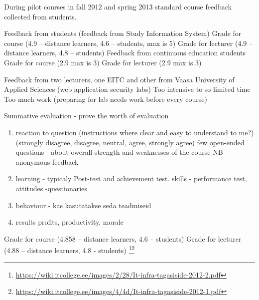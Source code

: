 During pilot courses in fall 2012 and spring 2013 standard course feedback collected from students. 

Feedback from students (feedback from Study Information System)
Grade for course  (4.9 -- distance learners, 4.6 -- students, max is 5) 
Grade for lecturer (4.9 -- distance learners, 4.8 -- students)
Feedback from continuous education students
Grade for course (2.9 max is 3)
Grade for lecturer (2.9 max is 3)



Feedback from two lecturers, one \gls{EITC} and other from Vaasa University of Applied Sciences (web application security labs)
Too intensive to so limited time
Too much work (preparing for lab needs work before every course)


Summative evaluation - prove the worth of evaluation
\begin{enumerate}
\item reaction to question (instructions where clear and easy to understand to me?) (strongly disagree, disagree, neutral, agree, strongly agree) few open-ended questions - about owerall strength and weaknesses of the course NB anonymous feedback
\item learning - typicaly Post-test and achievement test. skills - performance test, attitudes -questionaries
\item behaviour - kas kasutatakse seda teadmiseid
\item results profits, productivity, morale
\end{enumerate}

Grade for course  (4.858 – distance learners, 4.6 – students)
Grade for lecturer (4.88 – distance learners, 4.8 - students) \footnote{\url{https://wiki.itcollege.ee/images/2/28/It-infra-tagasiside-2012-2.pdf}}\footnote{\url{https://wiki.itcollege.ee/images/4/4d/It-infra-tagasiside-2012-1.pdf}}



